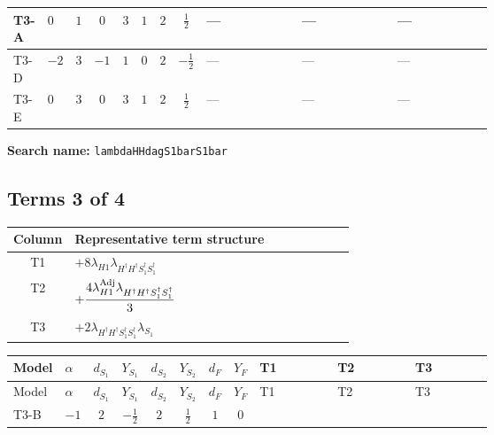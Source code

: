 \documentclass[8pt]{article}
\begin{document}
\begin{landscape}
\begin{longtable}{@{}llcccccc >{\raggedright\arraybackslash}p{0.21\linewidth} >{\raggedright\arraybackslash}p{0.21\linewidth} >{\raggedright\arraybackslash}p{0.21\linewidth}@{}}
\midrule
T3-A & $0$ & $1$ & $0$ & $3$ & $1$ & $2$ & $\frac{1}{2}$ & --- & --- & --- \\
\midrule
T3-D & $-2$ & $3$ & $-1$ & $1$ & $0$ & $2$ & $-\frac{1}{2}$ & --- & --- & --- \\
\midrule
T3-E & $0$ & $3$ & $0$ & $3$ & $1$ & $2$ & $\frac{1}{2}$ & --- & --- & --- \\
\midrule
\bottomrule
\end{longtable}
\clearpage
\noindent\textbf{Search name: }\texttt{lambdaHHdagS1barS1bar}\par\smallskip
\subsection*{Terms 3 of 4}
\begin{center}
\begin{tabular}{@{}c >{\raggedright\arraybackslash}p{0.82\linewidth}@{}}
\toprule
Column & Representative term structure \\
\midrule
T1 & \(\displaystyle +8 {\lambda_{H1}} {\lambda_{H^\dagger H^\dagger S_1^\dagger S_1^\dagger}}\) \\
\midrule
T2 & \(\displaystyle +\frac{4 {\lambda_{H1}^{\rm Adj}} {\lambda_{H^\dagger H^\dagger S_1^\dagger S_1^\dagger}}}{3}\) \\
\midrule
T3 & \(\displaystyle +2 {\lambda_{H^\dagger H^\dagger S_1^\dagger S_1^\dagger}} {\lambda_{S_1}}\) \\
\midrule
\bottomrule
\end{tabular}
\end{center}
\smallskip
\tiny
\begin{longtable}{@{}llcccccc >{\raggedright\arraybackslash}p{0.21\linewidth} >{\raggedright\arraybackslash}p{0.21\linewidth} >{\raggedright\arraybackslash}p{0.21\linewidth}@{}}
\toprule
Model & $\alpha$ & $d_{S_1}$ & $Y_{S_1}$ & $d_{S_2}$ & $Y_{S_2}$ & $d_F$ & $Y_F$ & T1 & T2 & T3 \\
\midrule
\endfirsthead
\toprule
Model & $\alpha$ & $d_{S_1}$ & $Y_{S_1}$ & $d_{S_2}$ & $Y_{S_2}$ & $d_F$ & $Y_F$ & T1 & T2 & T3 \\
\midrule
\endhead
T3-B & $-1$ & $2$ & $-\frac{1}{2}$ & $2$ & $\frac{1}{2}$ & $1$ & $0$ & \scriptsize\adjustbox{max width=\linewidth}{$\begin{gathered} +8 {\lambda_{H1}} {\lambda_{H^\dagger H^\dagger S_1^\dagger S_1^\dagger}}\end{gathered}$} & \scriptsize\adjustbox{max width=\linewidth}{$\begin{gathered} +\frac{4 {\lambda_{H1}^{\rm Adj}} {\lambda_{H^\dagger H^\dagger S_1^\dagger S_1^\dagger}}}{3}\end{gathered}$} & \scriptsize\adjustbox{max width=\linewidth}{$\begin{gathered} +2 {\lambda_{H^\dagger H^\dagger S_1^\dagger S_1^\dagger}} {\lambda_{S_1}}\end{gathered}$} \\

\end{longtable}
\end{landscape}
\end{document}
